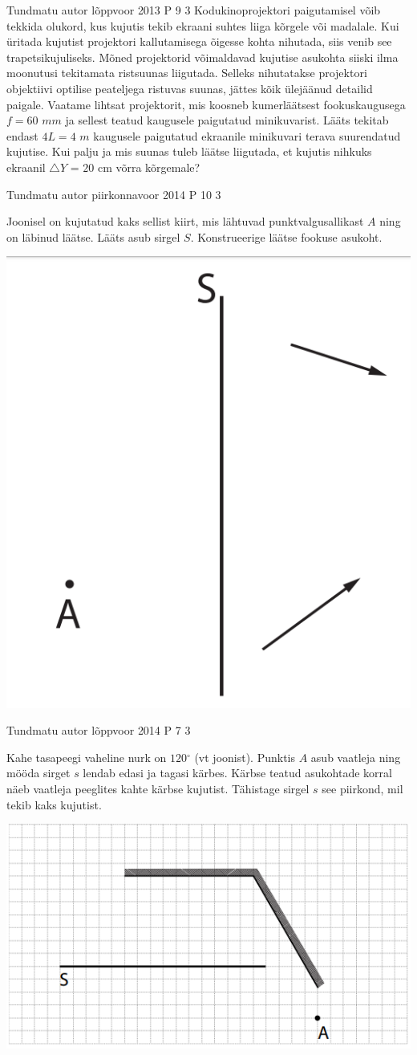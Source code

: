 \documentclass[11pt]{article}
\begin{document}
{%
{Tundmatu autor} %
{lõppvoor} %
{2013} %
{P 9} %
{3} %
{
\ifStatement
Kodukinoprojektori paigutamisel võib tekkida olukord, kus kujutis tekib ekraani suhtes liiga kõrgele või madalale. Kui üritada kujutist projektori kallutamisega õigesse kohta nihutada, siis venib see trapetsikujuliseks. Mõned projektorid võimaldavad kujutise asukohta siiski ilma moonutusi tekitamata ristsuunas liigutada. Selleks nihutatakse projektori objektiivi optilise peateljega ristuvas suunas, jättes kõik ülejäänud detailid paigale. Vaatame lihtsat projektorit, mis koosneb kumerläätsest fookuskaugusega $f = 60$ $mm$ ja sellest teatud kaugusele paigutatud minikuvarist. Lääts tekitab endast $4L = 4$ $m$ kaugusele paigutatud ekraanile minikuvari terava suurendatud kujutise. Kui palju ja mis suunas tuleb läätse liigutada, et kujutis nihkuks ekraanil $\triangle$$Y$ = $20$ cm võrra kõrgemale?
\fi
}

{Tundmatu autor} %
{piirkonnavoor} %
{2014} %
{P 10} %
{3} %
{
\ifStatement
Joonisel on kujutatud kaks sellist kiirt, mis lähtuvad punktvalgusallikast $A$ ning on läbinud läätse. Lääts asub sirgel $S$. Konstrueerige läätse fookuse asukoht.
\begin{center}
	\includegraphics[width=0.5\linewidth]{2014-v2p-10-yl.PNG}
\end{center}
\fi
}


{Tundmatu autor} %
{lõppvoor} %
{2014} %
{P 7} %
{3} %
{
\ifStatement
Kahe tasapeegi vaheline nurk on $120$$^{\circ}$  (vt joonist). Punktis $A$ asub vaatleja ning mööda sirget $s$ lendab edasi ja tagasi kärbes. Kärbse teatud asukohtade korral näeb vaatleja peeglites kahte kärbse kujutist. Tähistage sirgel $s$ see piirkond, mil tekib kaks kujutist.
\begin{center}
	\includegraphics[width=0.5\linewidth]{2014-v3p-07-yl.PNG}
\end{center}
\fi
}


}
\end{document}
